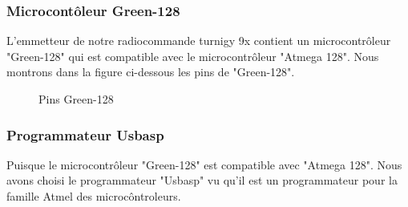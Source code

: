 	\subsubsection{Microcontôleur Green-128}
	L'emmetteur de notre radiocommande turnigy 9x contient un microcontrôleur "Green-128" qui est compatible avec le microcontrôleur  "Atmega 128". Nous montrons dans la figure ci-dessous les pins de "Green-128". 
	\begin{figure}[h]
		\begin{center}
			\centering
		\end{center}
		\caption{Pins Green-128\label{fig:P.G}}
	\end{figure}
\newpage
	\subsubsection{Programmateur Usbasp}
	Puisque le microcontrôleur "Green-128" est compatible avec "Atmega 128". Nous avons choisi le programmateur "Usbasp" vu qu'il est un programmateur pour la famille Atmel des microcôntroleurs. 
	
